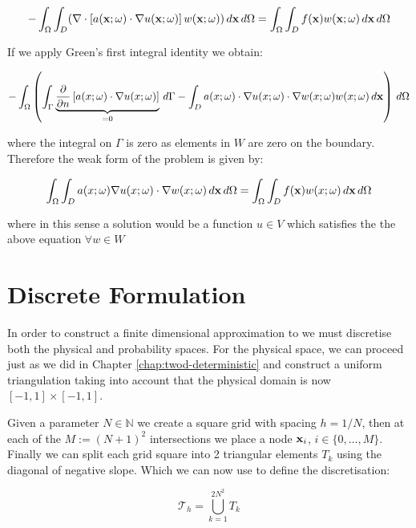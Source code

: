 \begin{equation}
    -\int_{\Omega}\int_D(\nabla\cdot\left[
        a(\mathbf{x};\omega)\cdot\nabla u(\mathbf{x};\omega)\right]
    w(\mathbf{x};\omega))\, d\mathbf{x}\, d\Omega =
        \int_{\Omega}\int_Df(\mathbf{x})w(\mathbf{x};\omega)\, d\mathbf{x}\, d\Omega
\end{equation}

If we apply Green's first integral identity we obtain:

\begin{equation}
    -\int_{\Omega}\left(\int_{\Gamma}\underbrace{\frac{\partial}{\partial n}
        \left[a(x;\omega)\cdot\nabla u(x;\omega)\right]}_{=0}\, d\Gamma
      -\int_D a(x;\omega)\cdot\nabla u(x;\omega)\cdot\nabla w(x;\omega)
      w(x;\omega)\, d\mathbf{x}
  \right)\, d\Omega
\end{equation}

where the integral on $\Gamma$ is zero as elements in $W$ are zero on the
boundary. Therefore the weak form of the problem is given by:

\begin{equation}\label{eq:twod-stochastic-wk}
    \int_{\Omega}\int_Da(x;\omega)\nabla u(x;\omega)\cdot\nabla
    w(x;\omega)\, d\mathbf{x}\, d\Omega =
    \int_{\Omega}\int_D f(\mathbf{x})w(x;\omega)\, d\mathbf{x}\, d\Omega
\end{equation}

where in this sense a solution would be a function $u \in V$ which satisfies
the the above equation $\forall w \in W$

\section{Discrete Formulation}

In order to construct a finite dimensional approximation to
 we must discretise both the physical and probability
spaces. For the physical space, we can proceed just as we did in Chapter
\ref{chap:twod-deterministic} and construct a uniform triangulation taking
into account that the physical domain is now $[-1,1] \times [-1,1]$.

Given a parameter $N \in \mathbb{N}$ we create a
square grid with spacing $h = 1/N$, then at each of the $M := (N+1)^2$
intersections we place a node $\mathbf{x}_i$, $i \in \{0,\ldots, M\}$. Finally we
can split each grid square into 2 triangular elements $T_k$ using the diagonal
of negative slope. Which we can now use to define the discretisation:

\[
    \mathcal{T}_h = \bigcup_{k=1}^{2N^2}T_k
\]

